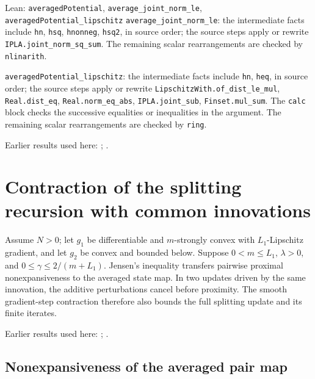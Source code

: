 \documentclass[11pt,a4paper]{report}
\begin{document}
\begin{leanbox}{Lean: \texttt{averagedPotential}, \texttt{average\_\allowbreak{}joint\_\allowbreak{}norm\_\allowbreak{}le}, \texttt{averagedPotential\_\allowbreak{}lipschitz}}
\texttt{average\_\allowbreak{}joint\_\allowbreak{}norm\_\allowbreak{}le}: the intermediate facts include \texttt{hn}, \texttt{hsq}, \texttt{hnonneg}, \texttt{hsq2}, in source order; the source steps apply or rewrite \texttt{IPLA.\allowbreak{}joint\_\allowbreak{}norm\_\allowbreak{}sq\_\allowbreak{}sum}. The remaining scalar rearrangements are checked by \texttt{nlinarith}.



\texttt{averaged\allowbreak{}Potential\_\allowbreak{}lipschitz}: the intermediate facts include \texttt{hn}, \texttt{heq}, in source order; the source steps apply or rewrite \texttt{Lipschitz\allowbreak{}With.\allowbreak{}of\_\allowbreak{}dist\_\allowbreak{}le\_\allowbreak{}mul}, \texttt{Real.\allowbreak{}dist\_\allowbreak{}eq}, \texttt{Real.\allowbreak{}norm\_\allowbreak{}eq\_\allowbreak{}abs}, \texttt{IPLA.\allowbreak{}joint\_\allowbreak{}sub}, \texttt{Finset.\allowbreak{}mul\_\allowbreak{}sum}. The \texttt{calc} block checks the successive equalities or inequalities in the argument. The remaining scalar rearrangements are checked by \texttt{ring}.
\end{leanbox}


Earlier results used here: \cite[Section~3.1.1]{LangevinLean2026IPLA}; \cite[Section~3.1.2]{LangevinLean2026IPLA}.
\section{\texorpdfstring{Contraction of the splitting recursion with common innovations}{Contraction of the splitting recursion with common innovations}}
\label{proof-module-ProximalLangevin-SplittingContraction-lean}


Assume \(N>0\); let \(g_1\) be differentiable and \(m\)-strongly convex with \(L_1\)-Lipschitz gradient, and let \(g_2\) be convex and bounded below. Suppose \(0<m\le L_1\), \(\lambda>0\), and \(0\le\gamma\le2/(m+L_1)\). Jensen’s inequality transfers pairwise proximal nonexpansiveness to the averaged state map. In two updates driven by the same innovation, the additive perturbations cancel before proximity. The smooth gradient-step contraction therefore also bounds the full splitting update and its finite iterates.



Earlier results used here: \cite[Section~3.7]{LangevinLean2026IPLA}; \cite[Section~3.10]{LangevinLean2026ULASC}.
\subsection{\texorpdfstring{Nonexpansiveness of the averaged pair map}{Nonexpansiveness of the averaged pair map}}
\label{report-step-ProximalLangevin-SplittingContraction-lean-1}
\end{document}
